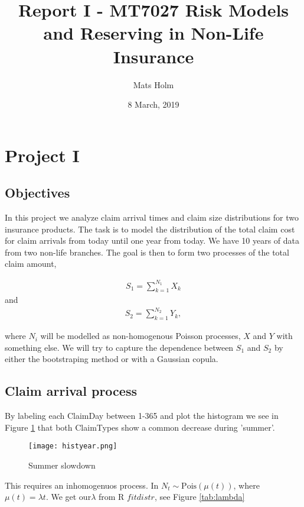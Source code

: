 \documentclass[11pt]{article}
\title{Report I - MT7027 Risk Models and Reserving in Non-Life Insurance}
\author{Mats Holm}
\date{8 March, 2019}                                           %
\begin{document}
\maketitle
\section*{Project I}
\subsection*{Objectives}

In this project we analyze claim
arrival times and claim size distributions for two insurance products.
The task is to model
the distribution of the total claim cost for claim arrivals from today until one year from
today. We have 10 years of data from two non-life branches. The goal is then to form two processes of the total claim amount,

\begin{align} \label{eq:sum1}
	S_1 = \sum_{k=1}^{N_1}  X_k 
\end{align}
and
\begin{align} \label{eq:sum2}
	 S_2 = \sum_{k=1}^{N_2} Y_k,
\end{align}

where $N_i$ will be modelled as non-homogenous Poisson processes, $X$ and $Y$ with something else. We will try to capture the dependence between
$S_1$ and $S_2$ by  either the
bootstraping method or with a Gaussian copula.


\subsection*{Claim arrival process}
By labeling each ClaimDay between 1-365 and plot the histogram we see in Figure \ref{fig:samplefig1} that both ClaimTypes show a common decrease during 'summer'.
 \begin{figure}[h]
 \center
  \texttt{[image: histyear.png]}
  \caption{Summer slowdown}
  \label{fig:samplefig1}
\end{figure}

This requires an inhomogenuos process. In $N_t  \sim  \mathrm{Pois}(\mu(t))$, where  $\mu(t) = \lambda t$. We get our$\lambda$ from R $fitdistr$, see Figure \ref{tab:lambda}
\end{document}
